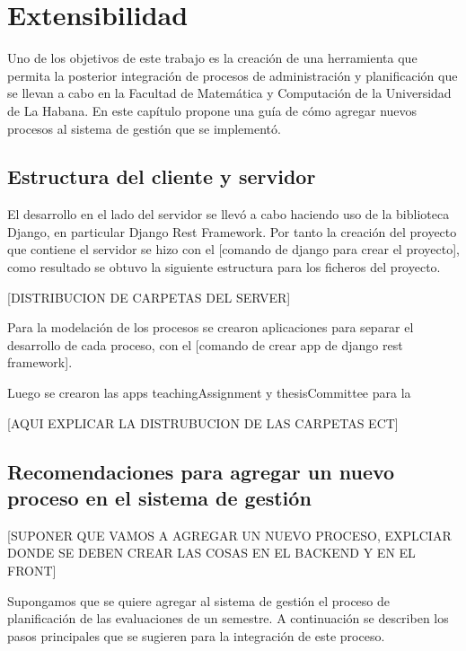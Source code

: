 \chapter{Extensibilidad}\label{chapter:extensibility}
Uno de los objetivos de este trabajo es la creación de una herramienta que 
permita la posterior integración de procesos de administración y planificación 
que se llevan a cabo en la Facultad de Matemática y Computación de la Universidad
de La Habana. 
En este capítulo propone una guía de cómo agregar nuevos 
procesos al sistema de gestión que se implementó.

\section{Estructura del cliente y servidor}
El desarrollo en el lado del servidor se llevó a cabo haciendo 
uso de la biblioteca Django, en particular Django Rest Framework. 
Por tanto la creación del proyecto que contiene el servidor se hizo 
con el [comando de django para crear el proyecto], como resultado 
se obtuvo la siguiente estructura para los ficheros del proyecto.

[DISTRIBUCION DE CARPETAS DEL SERVER]

Para la modelación de los procesos se crearon aplicaciones para separar 
el desarrollo de cada proceso, con el [comando de crear app de django rest framework]. 

Luego se crearon las apps teachingAssignment y thesisCommittee para la 

[AQUI EXPLICAR LA DISTRUBUCION DE LAS CARPETAS ECT]

\section{Recomendaciones para agregar un nuevo proceso en el sistema de gestión}
[SUPONER QUE VAMOS A AGREGAR UN NUEVO PROCESO, EXPLCIAR DONDE SE DEBEN CREAR LAS 
COSAS EN EL BACKEND Y EN EL FRONT]


Supongamos que se quiere agregar al sistema de gestión el proceso de planificación de 
las evaluaciones de un semestre. A continuación se describen los pasos principales
que se sugieren para la integración de este proceso.

